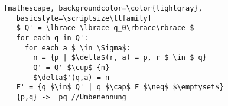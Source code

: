 \documentclass[
    border=0.2cm,
    convert={density=600}
]{standalone}
\begin{document}
\begin{lstlisting} [mathescape, backgroundcolor=\color{lightgray},
    basicstyle=\scriptsize\ttfamily]
    $ Q' = \lbrace \lbrace q_0\rbrace\rbrace $
    for each q in Q':
      for each a $ \in \Sigma$:
        n = {p | $\delta$(r, a) = p, r $ \in $ q}
        Q' = Q' $\cup$ {n}
        $\delta$'(q,a) = n
    F' = {q $\in$ Q' | q $\cap$ F $\neq$ $\emptyset$}
    {p,q} ->  pq //Umbenennung
\end{lstlisting}
\end{document}
